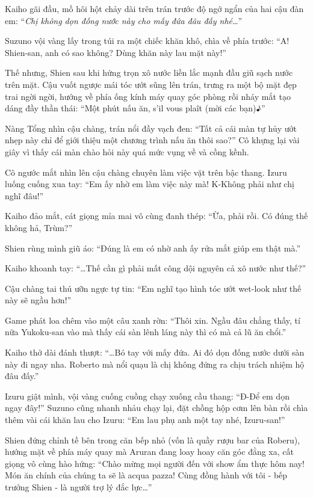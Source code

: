 \documentclass[../main.tex]{subfiles}
\begin{document}
Kaiho gãi đầu, mồ hôi hột chảy dài trên trán trước độ ngớ ngẩn của hai cậu đàn em: ``\textit{Chị không dọn đống nước này cho mấy đứa đâu đấy nhé\dots}''

Suzuno vội vàng lấy trong túi ra một chiếc khăn khô, chìa về phía trước: ``A! Shien-san, anh có sao không? Dùng khăn này lau mặt này!''

Thế nhưng, Shien sau khi hứng trọn xô nước liền lắc mạnh đầu giũ sạch nước trên mặt. Cậu vuốt ngược mái tóc ướt sũng lên trán, trưng ra một bộ mặt đẹp trai ngời ngời, hướng về phía ống kính máy quay góc phòng rồi nháy mắt tạo dáng đầy thần thái: ``Một phút nấu ăn, s'il vous plaît (mời các bạn)♪''


Nàng Tổng nhìn cậu chàng, trán nổi đầy vạch đen: ``Tất cả cái màn tự hủy ướt nhẹp này chỉ để giới thiệu một chương trình nấu ăn thôi sao?'' Cô khựng lại vài giây vì thấy cái màn chào hỏi này quá mức vụng về và cồng kềnh.

Cô ngước mắt nhìn lên cậu chàng chuyên làm việc vặt trên bậc thang. Izuru luống cuống xua tay: ``Em ấy nhờ em làm việc này mà! K-Không phải như chị nghĩ đâu!''

Kaiho đảo mắt, cát giọng mỉa mai vô cùng đanh thép: ``Ừa, phải rồi. Có đúng thế không hả, Trùm?''

Shien rùng mình giũ áo: ``Đúng là em có nhờ anh ấy rửa mắt giúp em thật mà.''

Kaiho khoanh tay: ``\dots Thế cần gì phải mất công dội nguyên cả xô nước như thế?''

Cậu chàng tai thú ưỡn ngực tự tin: ``Em nghĩ tạo hình tóc ướt wet-look như thế này sẽ ngầu hơn!''

Game phát loa chêm vào một câu xanh rờn: ``Thôi xin. Ngầu đâu chẳng thấy, tí nữa Yukoku-san vào mà thấy cái sàn lênh láng này thì có mà cả lũ ăn chổi.''

Kaiho thở dài đánh thượt: ``\dots Bó tay với mấy đứa. Ai đó dọn đống nước dưới sàn này đi ngay nha. Roberto mà nổi quạu là chị không đứng ra chịu trách nhiệm hộ đâu đấy.''

Izuru giật mình, vội vàng cuống cuồng chạy xuống cầu thang: ``Đ-Để em dọn ngay đây!'' Suzuno cũng nhanh nhảu chạy lại, đặt chồng hộp cơm lên bàn rồi chìa thêm vài cái khăn lau cho Izuru: ``Em lau phụ anh một tay nhé, Izuru-san!''

\ct

Shien đứng chỉnh tề bên trong căn bếp nhỏ (vốn là quầy rượu bar của Roberu), hướng mặt về phía máy quay mà Aruran đang loay hoay căn góc đằng xa, cất giọng vô cùng hào hứng: ``Chào mừng mọi người đến với show ẩm thực hôm nay! Món ăn chính của chúng ta sẽ là acqua pazza! Cùng đồng hành với tôi - bếp trưởng Shien - là người trợ lý đắc lực\dots''
\end{document}
